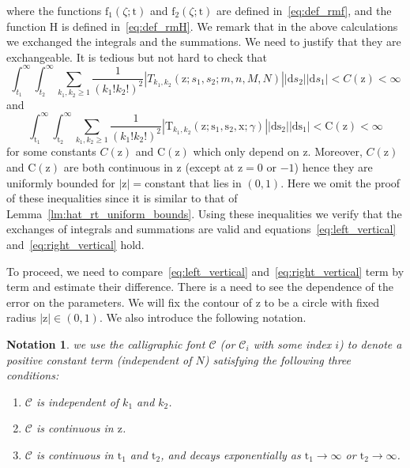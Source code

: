 \documentclass{article}
\newtheorem{notation}[thm]{Notation}
\numberwithin{equation}{section}
\newcommand{\CC}{\mathcal{C}}
\newcommand{\rz}{\mathrm{z}}
\begin{document}
where  the functions $\mathrm{f}_1(\zeta;\mathrm{t})$ and $\mathrm{f}_2(\zeta;\mathrm{t})$ are defined in~\eqref{eq:def_rmf}, and the function $\mathrm{H}$ is defined in~\eqref{eq:def_rmH}. We remark that in the above calculations we exchanged the integrals and the summations. We need to justify that they are exchangeable. It is tedious but not hard to check that
\begin{equation}
	\label{eq:aux_10}
	\int_{t_1}^\infty\int_{t_2}^\infty \sum_{k_1,k_2\ge 1}\frac{1}{(k_1!k_2!)^2} \left|T_{k_1,k_2}(\mathrm{z};s_1,s_2;m,n,M,N)\right||\mathrm{d}s_2||\mathrm{d}s_1|<C(\rz)<\infty
\end{equation}
and 
\begin{equation}
	\label{eq:aux_11}
	\int_{\mathrm{t}_1}^\infty\int_{\mathrm{t}_2}^\infty \sum_{k_1,k_2\ge 1}\frac{1}{(k_1!k_2!)^2} \left|\mathrm{T}_{k_1,k_2}(\mathrm{z};\mathrm{s}_1,\mathrm{s}_2,\mathrm{x};\gamma)\right||\mathrm{d}\mathrm{s}_2||\mathrm{d}\mathrm{s}_1|<\mathrm{C}(\rz)<\infty
\end{equation}
for some constants $C(\rz)$ and $\mathrm{C}(\rz)$ which only depend on $\mathrm{z}$. Moreover, $C(\rz)$ and $\mathrm{C}(\rz)$ are both continuous in $\rz$ (except at $\rz=0$ or $-1$) hence they are uniformly bounded for $|\rz|=$constant that lies in $(0,1)$.  Here we omit the proof of these inequalities since it is similar to that of Lemma~\ref{lm:hat_rt_uniform_bounds}. Using these inequalities we verify that the exchanges of integrals and summations are valid and equations~\eqref{eq:left_vertical} and~\eqref{eq:right_vertical} hold.


To proceed, we need to compare~\eqref{eq:left_vertical} and~\eqref{eq:right_vertical} term by term and estimate their difference. There is a need to see the dependence of the error on the parameters. We will fix the contour of $\rz$ to be a circle with fixed radius $|\rz|\in(0,1)$. We also introduce the following notation.

\begin{notation}
	\label{notation:CC}
	we use the calligraphic font $\CC$ (or $\CC_i$ with some index $i$) to denote a positive constant term (independent of $N$) satisfying the following three conditions:
	\begin{enumerate}[(1)]
		\item $\CC$ is independent of $k_1$ and $k_2$.
		\item $\CC$ is continuous in $\mathrm{z}$.
		\item $\CC$ is continuous in $\mathrm{t}_1$ and $\mathrm{t}_2$, and decays exponentially as $\mathrm{t}_1\to\infty$ or $\mathrm{t}_2\to\infty$.
	\end{enumerate}
\end{notation}
\end{document}
